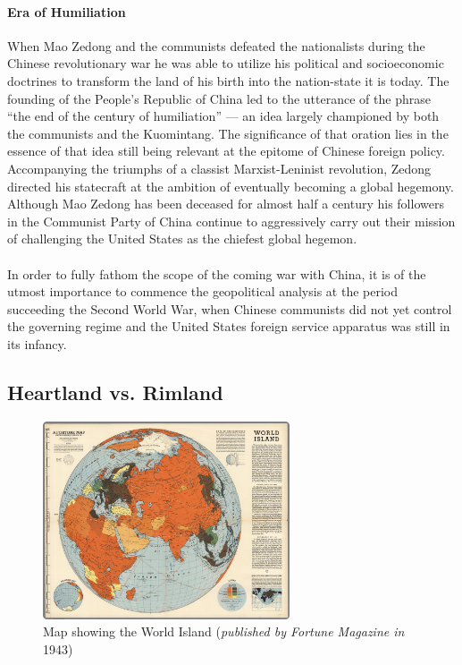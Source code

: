 \documentclass[12pt]{article}
\begin{document}
\paragraph{Era of Humiliation} When Mao Zedong and the communists defeated the nationalists during the Chinese revolutionary war he was able to utilize his political and socioeconomic doctrines to transform the land of his birth into the nation-state it is today. The founding of the People's Republic of China led to the utterance of the phrase “the end of the century of humiliation” — an idea largely championed by both the communists and the Kuomintang. The significance of that oration lies in the essence of that idea still being relevant at the epitome of Chinese foreign policy. Accompanying the triumphs of a classist Marxist-Leninist revolution, Zedong directed his statecraft at the ambition of eventually becoming a global hegemony. Although Mao Zedong has been deceased for almost half a century his followers in the Communist Party of China continue to aggressively carry out their mission of challenging the United States as the chiefest global hegemon. 
\paragraph{} In order to fully fathom the scope of the coming war with China, it is of the utmost importance to commence the geopolitical analysis at the period succeeding the Second World War, when Chinese communists did not yet control the governing regime and the United States foreign service apparatus was still in its infancy.
\begin{center}
\subsection{Heartland vs. Rimland}
\end{center}

\begin{figure}
\centering
\includegraphics[width=0.65\textwidth]{Images/World_Island.jpg}
\caption{Map showing the World Island (\footnotesize{\emph{published by Fortune Magazine in} 1943})}
\label{fig:fig1} 
\end{figure}
\end{document}

